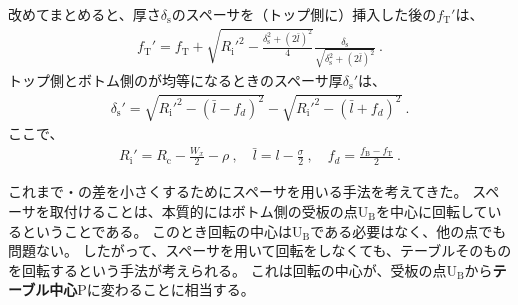 \begin{hosoku}
改めてまとめると、厚さ$\delta_\mathrm s$のスペーサを（トップ側に）挿入した後の\TopAlocationLength$f_\mathrm T'$は、
\begin{align*}
  f_\mathrm T'
  = f_\mathrm T+\sqrt{R_\mathrm i'^2-\frac{\delta_\mathrm s^2+(2\bar l)^2}4}\frac{\delta_\mathrm s}{\sqrt{\delta_\mathrm s^2+(2\bar l)^2}}\ .
\end{align*}
トップ側とボトム側の\AlocationLength が均等になるときのスペーサ厚$\delta_\mathrm s'$は、
\begin{align*}
  \delta_\mathrm s' = \sqrt{R_\mathrm i'^2-(\bar l-f_d)^2}-\sqrt{R_\mathrm i'^2-(\bar l+f_d)^2}\ .
\end{align*}
ここで、
\begin{align*}
  R_\mathrm i' = R_\mathrm c-\frac{W_x}2-\rho\ ,\quad
  \bar l = l-\frac\sigma2\ ,\quad
  f_d = \frac{f_\mathrm B-f_\mathrm T}2\ .
\end{align*}
\end{hosoku}



\clearpage
これまで\TopAlocationLength・\BottomAlocationLength の差を小さくするためにスペーサを用いる手法を考えてきた。
スペーサを取付けることは、本質的にはボトム側の受板の点U$_\mathrm B$を中心に回転しているということである。
このとき回転の中心はU$_\mathrm B$である必要はなく、他の点でも問題ない。
したがって、スペーサを用いて回転をしなくても、テーブルそのものを回転するという手法が考えられる。
これは回転の中心が、受板の点U$_\mathrm B$から\textbf{テーブル中心}Pに変わることに相当する。

